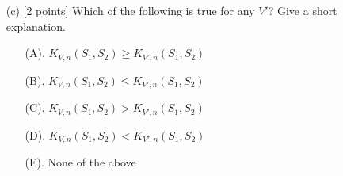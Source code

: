 \documentclass{article}
\newif\ifsolutions
\newenvironment{labelledanswer}{{\bf Answer:} \sf }{}%
\newcommand{\answer}[2]
{{
\ifsolutions
\begin{labelledanswer}
\color{red} 
#2
\end{labelledanswer}
\else
#1
\fi
}}
\begin{document}
\begin{itemize}
    \answer{}{
%
This is still a valid kernel.

We restrict the vocab to $V'$ and include a out-of-vocab or UNK token. So an immediate impact of restricting Vocabulary would be lower dimensional feature space compared to $V$. 
 
The Kernel function:
$$
K_{V',n}(S_1, S_2) = \sum_{x\in g_n(S_1)} \sum_{z\in g_n(S_2)} \delta(x, z)
$$

The feature mapping would be similar to above kernel ($K_{V,n}(S_1, S_2)$). The difference here seems to be that the x has already gone through a previous feature map. This extra feature map just map input to a lower dimensional space (since $V'$ should have fewer vocab than $V$) where dimension equals to $v'$ where $v'$ is the number of element in $V'$ (including UNK). 

On a related note, back in PSET2 Q3, we have discussed constructing Kernels. The feature mapping for $V'$ can be viewed as $K(x,z) = K_3(\phi(x),\phi(x))$ where the initial mapping to restricted $V'$ is the $\phi(x)$. Since we know $K_{V,n}(S_1, S_2)$ is a valid kernel, so by extension, $K_{V',n}(S_1, S_2)$ is also a valid kernel.

    }
    
    \clearpage  
    
    \item[(c)] [2 points] Which of the following is true for any $V'$? Give a short explanation. 
    \begin{enumerate}
        \item [(A).] $K_{V, n}(S_1, S_2) \geq K_{V', n}(S_1, S_2)$
        \item [(B).] $K_{V, n}(S_1, S_2) \leq K_{V', n}(S_1, S_2)$
        \item [(C).] $K_{V, n}(S_1, S_2) > K_{V', n}(S_1, S_2)$
        \item [(D).] $K_{V, n}(S_1, S_2) < K_{V', n}(S_1, S_2)$
        \item [(E).] None of the above
    \end{enumerate}
    

\end{itemize}
\end{document}
